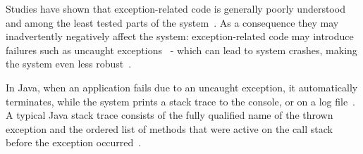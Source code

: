 
Studies have shown that exception-related code is generally poorly understood and among the least tested parts of the system~\cite{miller1997issues,Robil00,shah2010understanding, 
garcia2007extracting,garcia2001comparative,cabral2007exception,coelho2011unveiling,yuan:2014.osdi}.
As a consequence they may inadvertently negatively affect the system: exception-related code may introduce failures such as 
uncaught exceptions~\cite{jo2004uncaught, Zhang12} - 
which can lead to system crashes, making the system even less robust~\cite{coelho2011unveiling}.

In Java, when an application fails due to an uncaught exception, 
it automatically terminates, while the system prints a stack trace to the console, 
or on a log file~\cite{gosling2000java}.  A typical Java stack trace consists of  the fully qualified name 
of the thrown exception and the ordered list of methods that were active on the call stack before 
the exception occurred~\cite{gosling2000java,bloch2008effective}.




